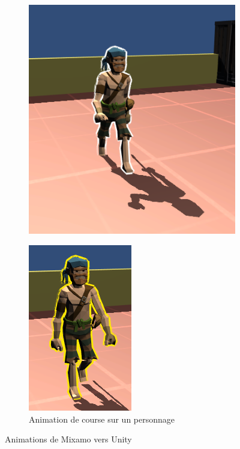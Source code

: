 \documentclass[french, 12pt]{article}
\begin{document}
            \begin{figure}[hbt!]
                \centering
                \begin{subfigure}[b]{0.3\textwidth}
                    \includegraphics[scale=0.1]{white_outline.png} 
                    \caption{}
                \end{subfigure}
                \hspace{150pt}
                \begin{subfigure}[b]{0.3\textwidth}
                    \includegraphics[scale=0.5]{yellow_outline.png} 
                    \caption{Animation de course sur un personnage}
                \end{subfigure}
                \caption{Animations de Mixamo vers Unity}
            \end{figure}
\end{document}
